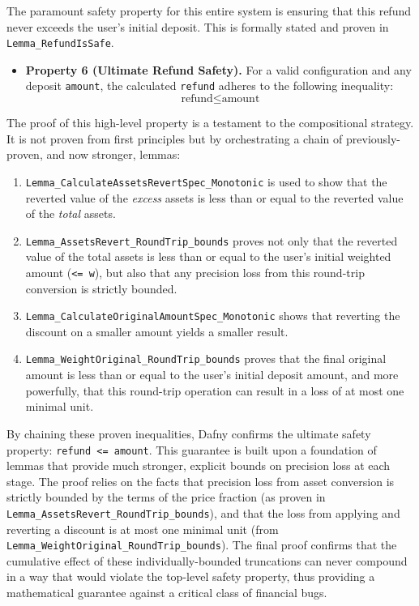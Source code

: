 \documentclass[
  english,
  onecolumn]{article}
\providecommand{\tightlist}{%
  \setlength{\itemsep}{0pt}\setlength{\parskip}{0pt}}
\begin{document}
The paramount safety property for this entire system is ensuring that
this refund never exceeds the user's initial deposit. This is formally
stated and proven in \texttt{Lemma\_RefundIsSafe}.

\begin{itemize}
\tightlist
\item
  \textbf{Property 6 (Ultimate Refund Safety).} For a valid
  configuration and any deposit \texttt{amount}, the calculated
  \texttt{refund} adheres to the following inequality:
  \[ \text{refund} \le \text{amount} \]
\end{itemize}

The proof of this high-level property is a testament to the
compositional strategy. It is not proven from first principles but by
orchestrating a chain of previously-proven, and now stronger, lemmas:

\begin{enumerate}
\def\labelenumi{\arabic{enumi}.}
\tightlist
\item
  \texttt{Lemma\_CalculateAssetsRevertSpec\_Monotonic} is used to show
  that the reverted value of the \emph{excess} assets is less than or
  equal to the reverted value of the \emph{total} assets.
\item
  \texttt{Lemma\_AssetsRevert\_RoundTrip\_bounds} proves not only that
  the reverted value of the total assets is less than or equal to the
  user's initial weighted amount (\texttt{\textless{}=\ w}), but also
  that any precision loss from this round-trip conversion is strictly
  bounded.
\item
  \texttt{Lemma\_CalculateOriginalAmountSpec\_Monotonic} shows that
  reverting the discount on a smaller amount yields a smaller result.
\item
  \texttt{Lemma\_WeightOriginal\_RoundTrip\_bounds} proves that the
  final original amount is less than or equal to the user's initial
  deposit amount, and more powerfully, that this round-trip operation
  can result in a loss of at most one minimal unit.
\end{enumerate}

By chaining these proven inequalities, Dafny confirms the ultimate
safety property: \texttt{refund\ \textless{}=\ amount}. This guarantee
is built upon a foundation of lemmas that provide much stronger,
explicit bounds on precision loss at each stage. The proof relies on the
facts that precision loss from asset conversion is strictly bounded by
the terms of the price fraction (as proven in
\texttt{Lemma\_AssetsRevert\_RoundTrip\_bounds}), and that the loss from
applying and reverting a discount is at most one minimal unit (from
\texttt{Lemma\_WeightOriginal\_RoundTrip\_bounds}). The final proof
confirms that the cumulative effect of these individually-bounded
truncations can never compound in a way that would violate the top-level
safety property, thus providing a mathematical guarantee against a
critical class of financial bugs.
\end{document}
